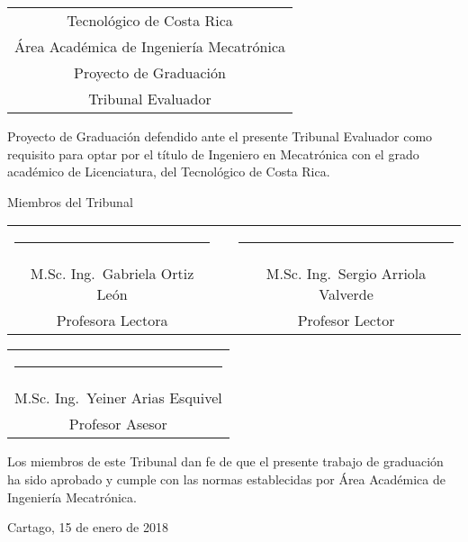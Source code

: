 \thispagestyle{empty}

\newcommand{\lectorI }{M.Sc. Ing. \,Gabriela Ortiz León     }
\newcommand{\lectorII}{M.Sc. Ing. \,Sergio Arriola Valverde }
\newcommand{\director}{M.Sc. Ing. \,Yeiner Arias Esquivel  }


\begin{center}
  \begin{tabular}{c}
    Tecnológico de Costa Rica \\
    Área Académica de Ingeniería Mecatrónica \\
    Proyecto de Graduación \\
    Tribunal Evaluador
  \end{tabular}
\end{center}

\vfill

Proyecto de Graduación defendido ante el presente Tribunal Evaluador como 
requisito para optar por el título de Ingeniero en Mecatrónica con el grado 
académico de Licenciatura, del Tecnológico de Costa Rica.  

\vfill

\vspace*{20mm}
\begin{center}
 Miembros del Tribunal
\end{center}
\vspace*{8mm}

\vfill

\begin{center}
  \begin{tabular}{ccc}
    \rule{70mm}{0.5pt} & \rule{15mm}{0pt} & \rule{70mm}{0.5pt} \\
    \lectorI && \lectorII \\
    Profesora Lectora && Profesor Lector
  \end{tabular}
  
  \vspace{10mm}

  \begin{tabular}{c}
    \rule{6cm}{0.5pt} \\
    \director \\
    Profesor Asesor
  \end{tabular}
\end{center}

\vfill


Los miembros de este Tribunal dan fe de que el presente trabajo de graduación
ha sido aprobado y cumple con las normas establecidas por Área Académica de
Ingeniería Mecatrónica.

\vfill

\begin{center}
  Cartago, 15 de enero de 2018\par
\end{center}

\cleardoublepage

